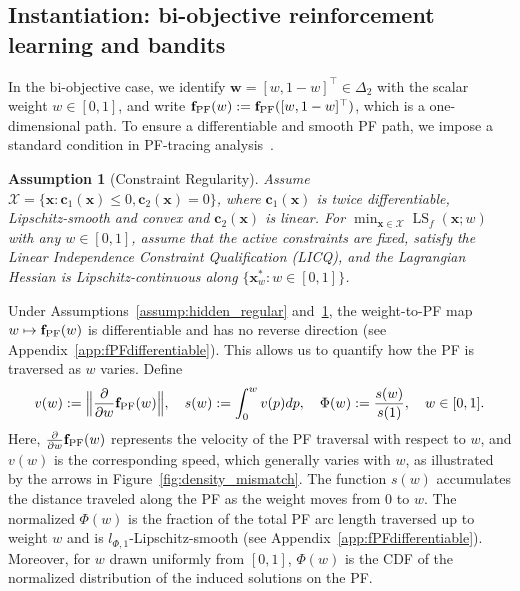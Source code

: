 \documentclass{article}
\newtheorem{assumption}{Assumption}
\newcommand{\bx}{\mathbf{x}}
\newcommand{\bw}{\mathbf{w}}
\newcommand{\X}{\mathcal{X}}
\newcommand{\LS}{\operatorname{LS}}
\newcommand{\fPF}{{\mathbf{f}_{\rm PF}}}
\newcommand{\Farc}{\Phi}
\begin{document}
\subsection{Instantiation: bi-objective reinforcement learning and bandits}
\label{sec:MDP}

In the bi-objective case, we identify $\bw=[w,1-w]^\top\in\Delta_2$ with the scalar weight $w\in[0,1]$, and write $\fPF(w):=\fPF([w,1-w]^\top)$, which is a one-dimensional path. To ensure a differentiable and smooth PF path, we impose a standard condition in PF-tracing analysis~\citep{schtze2005continuation,beltran2020pareto}.
\begin{assumption}[Constraint Regularity]
\label{assump:LICQ}
Assume $\X=\{\bx:\mathbf c_1(\bx)\le 0,\mathbf c_2(\bx)= 0\}$, where $\mathbf c_1(\bx)$ is twice differentiable, Lipschitz-smooth and convex and $\mathbf c_2(\bx)$ is linear. For $\min_{\bx\in\X}\LS_f(\bx;w)$ with any $w\in[0,1]$, assume that the active constraints are fixed, satisfy the Linear Independence Constraint Qualification (LICQ), and the Lagrangian Hessian is Lipschitz-continuous along $\{\bx_w^*:w\in[0,1]\}$.
\end{assumption}
Under Assumptions~\ref{assump:hidden_regular} and~\ref{assump:LICQ}, the weight-to-PF map $w\mapsto\fPF(w)$ is differentiable and has no reverse direction (see Appendix~\ref{app:fPFdifferentiable}). This allows us to quantify how the PF is traversed as $w$ varies. Define
\begin{align}
v(w):=\Big\|\frac{\partial }{\partial w}\fPF(w)\Big\|,\quad
s(w):=\int_0^w v(p) dp,\quad \Farc(w):=\frac{s(w)}{s(1)},\quad w\in[0,1].
\label{eq:arc_cdf_def}
\end{align}
Here, $\frac{\partial}{\partial w}\fPF(w)$ represents the velocity of the PF traversal with respect to $w$, and $v(w)$ is the corresponding speed, which generally varies with $w$, as illustrated by the arrows in Figure~\ref{fig:density_mismatch}.
The function $s(w)$ accumulates the distance traveled along the PF as the weight moves from $0$ to $w$.
The normalized $\Farc(w)$ is the fraction of the total PF arc length traversed up to weight $w$ and is $l_{\Farc,1}$-Lipschitz-smooth (see Appendix~\ref{app:fPFdifferentiable}). Moreover, for $w$ drawn uniformly from $[0,1]$, $\Farc(w)$ is the CDF of the normalized distribution of the induced solutions on the PF.
\end{document}
